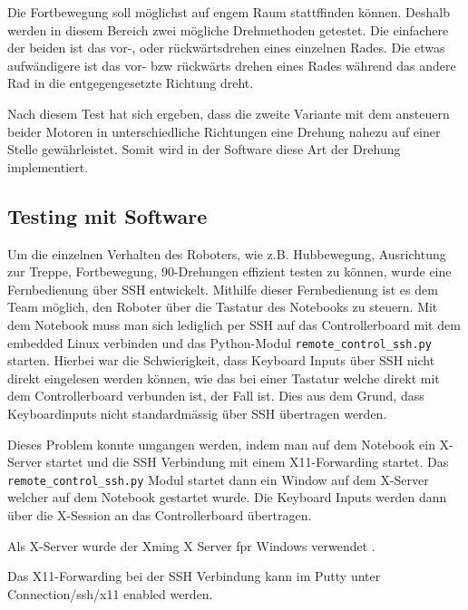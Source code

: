 Die Fortbewegung soll möglichst auf engem Raum stattffinden können. Deshalb werden in diesem Bereich zwei mögliche Drehmethoden getestet. Die einfachere der beiden ist das vor-, oder rückwärtsdrehen eines einzelnen Rades. Die etwas aufwändigere ist das vor- bzw rückwärts drehen eines Rades während das andere Rad in die entgegengesetzte Richtung dreht.

Nach diesem Test hat sich ergeben, dass die zweite Variante mit dem ansteuern beider Motoren in unterschiedliche Richtungen eine Drehung nahezu auf einer Stelle gewährleistet. Somit wird in der Software diese Art der Drehung implementiert.

\subsection{Testing mit Software}
Um die einzelnen Verhalten des Roboters, wie z.B. Hubbewegung, Ausrichtung zur Treppe, Fortbewegung, 90\textdegree-Drehungen effizient testen zu können, wurde eine Fernbedienung über SSH entwickelt. Mithilfe dieser Fernbedienung ist es dem Team möglich, den Roboter über die Tastatur des Notebooks zu steuern. Mit dem Notebook muss man sich lediglich per SSH auf das Controllerboard mit dem embedded Linux verbinden und das Python-Modul \texttt{remote\_control\_ssh.py} starten. Hierbei war die Schwierigkeit, dass Keyboard Inputs über SSH nicht direkt eingelesen werden können, wie das bei einer Tastatur welche direkt mit dem Controllerboard verbunden ist, der Fall ist. Dies aus dem Grund, dass Keyboardinputs nicht standardmässig über SSH übertragen werden. 

Dieses Problem konnte umgangen werden, indem man auf dem Notebook ein X-Server \cite{Wikipedia-X-Window-System} startet und die SSH Verbindung mit einem X11-Forwarding startet. Das \texttt{remote\_control\_ssh.py} Modul startet dann ein Window auf dem X-Server welcher auf dem Notebook gestartet wurde. Die Keyboard Inputs werden dann über die X-Session an das Controllerboard übertragen. 

Als X-Server wurde der Xming X Server fpr Windows verwendet \cite{Xming-X-Window-Server-Download}.

Das X11-Forwarding bei der SSH Verbindung kann im Putty unter Connection/ssh/x11 enabled werden. 

